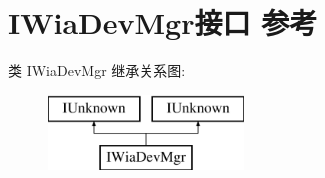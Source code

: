 \hypertarget{interface_i_wia_dev_mgr}{}\section{I\+Wia\+Dev\+Mgr接口 参考}
\label{interface_i_wia_dev_mgr}
类 I\+Wia\+Dev\+Mgr 继承关系图\+:\begin{figure}[H]
\begin{center}
\leavevmode
\includegraphics[height=2.000000cm]{interface_i_wia_dev_mgr}
\end{center}
\end{figure}
